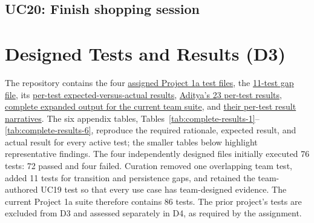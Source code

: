 \documentclass[sigconf]{acmart}
\begin{document}
\subsection{UC20: Finish shopping session}

\section{Designed Tests and Results (D3)}

The repository contains the four
\href{https://github.com/closeabigaile/SEf26_project/tree/main/Project3/test/project1a}{assigned Project 1a test files}, the
\href{https://github.com/closeabigaile/SEf26_project/blob/main/Project3/test/active/project1a_coverage_gaps_test.dart}{11-test gap file}, its
\href{https://github.com/closeabigaile/SEf26_project/blob/main/Project1a_Work/tests/coverage_gap_test_results_2026-09-01.md}{per-test expected-versus-actual results},
\href{https://github.com/closeabigaile/SEf26_project/blob/main/Project1a_Work/tests/aditya_uc06-10_test_results.md}{Aditya's 23 per-test results},
\href{https://github.com/closeabigaile/SEf26_project/blob/main/Project1a_Work/raw_test_output/project1a_team_suite_2026-09-01.txt}{complete expanded output for the current team suite}, and
\href{https://github.com/closeabigaile/SEf26_project/tree/main/Project1a_Work/tests}{their per-test result narratives}.
The six appendix tables, Tables~\ref{tab:complete-results-1}--
\ref{tab:complete-results-6}, reproduce the required rationale, expected
result, and actual result for every active test; the smaller tables below
highlight representative findings.
The four independently designed files initially executed 76 tests: 72 passed
and four failed. Curation removed one overlapping team test, added 11 tests for
transition and persistence gaps, and retained the team-authored UC19 test so
that every use case has team-designed evidence. The current Project 1a suite
therefore contains 86 tests. The prior project's tests are excluded from D3
and assessed separately in D4, as required by the assignment.
\end{document}
